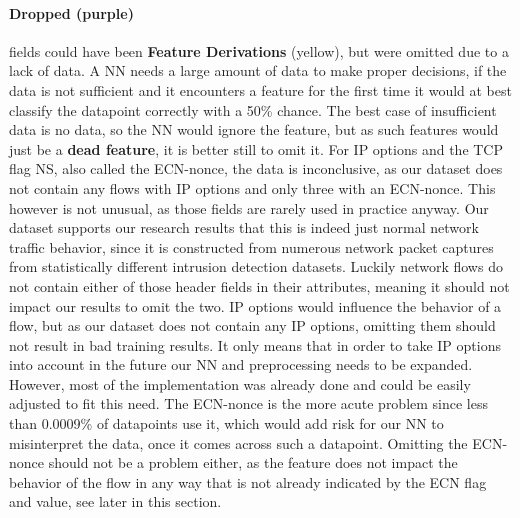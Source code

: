 \documentclass[
	ngerman,
	ruledheaders=section,%
	class=report,%
	thesis={type=bachelor},%
	accentcolor=9c,%
	custommargins=true,%
	marginpar=false,%
	parskip=half-,%
	fontsize=11pt,%
	twoside
]{tudapub}
\begin{document}
\paragraph{\colorbox{dropped}{\textbf{Dropped} (purple)}} fields could have been \colorbox{derivation}{\textbf{Feature Derivations} (yellow)}, but were omitted due to a lack of data.
A NN needs a large amount of data to make proper decisions, if the data is not sufficient and it encounters a feature for the first time it would at best classify the datapoint correctly with a 50\% chance.
The best case of insufficient data is no data, so the NN would ignore the feature, but as such features would just be a \textbf{dead feature}, it is better still to omit it.
For IP options and the TCP flag NS, also called the ECN-nonce, the data is inconclusive,
as our dataset does not contain any flows with IP options and only three with an ECN-nonce.
This however is not unusual, as those fields are rarely used in practice anyway.
Our dataset supports our research results that this is indeed just normal network traffic behavior,
since it is constructed from numerous network packet captures from statistically different intrusion detection datasets.
Luckily network flows do not contain either of those header fields in their attributes, meaning it should not impact our results to omit the two.
IP options would influence the behavior of a flow, but as our dataset does not contain any IP options, omitting them should not result in bad training results.
It only means that in order to take IP options into account in the future our NN and preprocessing needs to be expanded.
However, most of the implementation was already done and could be easily adjusted to fit this need.
The ECN-nonce is the more acute problem since less than 0.0009\% of datapoints use it,
which would add risk for our NN to misinterpret the data, once it comes across such a datapoint.
Omitting the ECN-nonce should not be a problem either, as the feature does not impact the behavior of the flow in any way that is not already indicated by the ECN flag and value, see later in this section.
\end{document}
